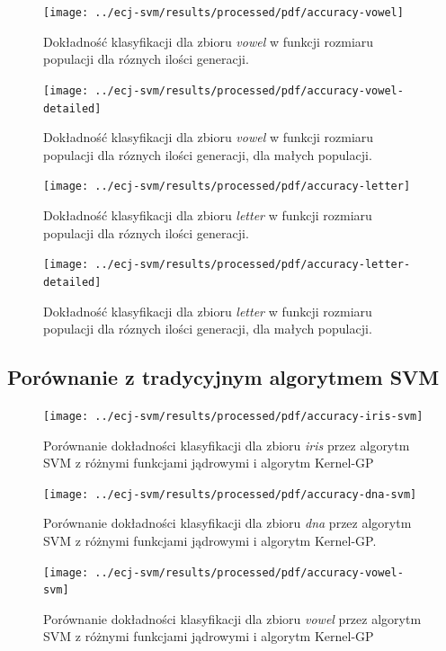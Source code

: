 \documentclass{article}
\begin{document}
		\begin{figure}[ht]
		\texttt{[image: ../ecj-svm/results/processed/pdf/accuracy-vowel]}
		\caption{Dokładność klasyfikacji dla zbioru \emph{vowel} w funkcji rozmiaru populacji dla róznych ilości generacji.\label{fig:acc-vowel}}
	\end{figure}
		
				\begin{figure}[ht]
		\texttt{[image: ../ecj-svm/results/processed/pdf/accuracy-vowel-detailed]}
		\caption{Dokładność klasyfikacji dla zbioru \emph{vowel} w funkcji rozmiaru populacji dla róznych ilości generacji, dla małych populacji.\label{fig:acc-vowel-detailed}}
	\end{figure}
	
	
		\begin{figure}[ht]
		\texttt{[image: ../ecj-svm/results/processed/pdf/accuracy-letter]}
		\caption{Dokładność klasyfikacji dla zbioru \emph{letter} w funkcji rozmiaru populacji dla róznych ilości generacji.\label{fig:acc-letter}}
	\end{figure}
		
				\begin{figure}[ht]
		\texttt{[image: ../ecj-svm/results/processed/pdf/accuracy-letter-detailed]}
		\caption{Dokładność klasyfikacji dla zbioru \emph{letter} w funkcji rozmiaru populacji dla róznych ilości generacji, dla małych populacji.\label{fig:acc-letter-detailed}}
	\end{figure}
		


	\subsection{Porównanie z tradycyjnym algorytmem SVM}
	\begin{figure}[ht]
		\texttt{[image: ../ecj-svm/results/processed/pdf/accuracy-iris-svm]}
		\caption{Porównanie dokładności klasyfikacji dla zbioru \emph{iris} przez algorytm SVM z różnymi funkcjami jądrowymi i algorytm Kernel-GP\label{fig:acc-iris-svm}}
	\end{figure}
	
		\begin{figure}[ht]
		\texttt{[image: ../ecj-svm/results/processed/pdf/accuracy-dna-svm]}
		\caption{Porównanie dokładności klasyfikacji dla zbioru \emph{dna} przez algorytm SVM z różnymi funkcjami jądrowymi i algorytm Kernel-GP.\label{fig:acc-dna-svm}}
	\end{figure}	
	
		\begin{figure}[ht]
		\texttt{[image: ../ecj-svm/results/processed/pdf/accuracy-vowel-svm]}
		\caption{Porównanie dokładności klasyfikacji dla zbioru \emph{vowel} przez algorytm SVM z różnymi funkcjami jądrowymi i algorytm Kernel-GP\label{fig:acc-vowel-svm}}
	\end{figure}
	
\end{document}
